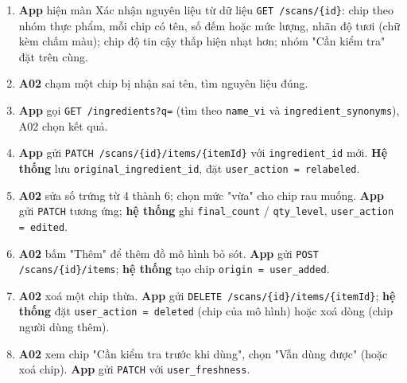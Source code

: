 \begin{enumerate}
\item \textbf{App} hiện màn Xác nhận nguyên liệu từ dữ liệu {\small\texttt{GET /\allowbreak{}\allowbreak{}scans/\allowbreak{}\allowbreak{}\{id\}}}: chip theo nhóm thực phẩm, mỗi chip có tên, số đếm hoặc mức lượng, nhãn độ tươi (chữ kèm chấm màu); chip độ tin cậy thấp hiện nhạt hơn; nhóm "Cần kiểm tra" đặt trên cùng.
\item \textbf{A02} chạm một chip bị nhận sai tên, tìm nguyên liệu đúng.
\item \textbf{App} gọi {\small\texttt{GET /\allowbreak{}\allowbreak{}ingredients?q=}} (tìm theo {\small\texttt{name\_\allowbreak{}\allowbreak{}vi}} và {\small\texttt{ingredient\_\allowbreak{}\allowbreak{}synonyms}}), A02 chọn kết quả.
\item \textbf{App} gửi {\small\texttt{PATCH /\allowbreak{}\allowbreak{}scans/\allowbreak{}\allowbreak{}\{id\}/\allowbreak{}\allowbreak{}items/\allowbreak{}\allowbreak{}\{itemId\}}} với {\small\texttt{ingredient\_\allowbreak{}\allowbreak{}id}} mới. \textbf{Hệ thống} lưu {\small\texttt{original\_\allowbreak{}\allowbreak{}ingredient\_\allowbreak{}\allowbreak{}id}}, đặt {\small\texttt{user\_\allowbreak{}\allowbreak{}action = relabeled}}.
\item \textbf{A02} sửa số trứng từ 4 thành 6; chọn mức "vừa" cho chip rau muống. \textbf{App} gửi {\small\texttt{PATCH}} tương ứng; \textbf{hệ thống} ghi {\small\texttt{final\_\allowbreak{}\allowbreak{}count}} /\allowbreak{} {\small\texttt{qty\_\allowbreak{}\allowbreak{}level}}, {\small\texttt{user\_\allowbreak{}\allowbreak{}action = edited}}.
\item \textbf{A02} bấm "Thêm" để thêm đồ mô hình bỏ sót. \textbf{App} gửi {\small\texttt{POST /\allowbreak{}\allowbreak{}scans/\allowbreak{}\allowbreak{}\{id\}/\allowbreak{}\allowbreak{}items}}; \textbf{hệ thống} tạo chip {\small\texttt{origin = user\_\allowbreak{}\allowbreak{}added}}.
\item \textbf{A02} xoá một chip thừa. \textbf{App} gửi {\small\texttt{DELETE /\allowbreak{}\allowbreak{}scans/\allowbreak{}\allowbreak{}\{id\}/\allowbreak{}\allowbreak{}items/\allowbreak{}\allowbreak{}\{itemId\}}}; \textbf{hệ thống} đặt {\small\texttt{user\_\allowbreak{}\allowbreak{}action = deleted}} (chip của mô hình) hoặc xoá dòng (chip người dùng thêm).
\item \textbf{A02} xem chip "Cần kiểm tra trước khi dùng", chọn "Vẫn dùng được" (hoặc xoá chip). \textbf{App} gửi {\small\texttt{PATCH}} với {\small\texttt{user\_\allowbreak{}\allowbreak{}freshness}}.

\end{enumerate}
